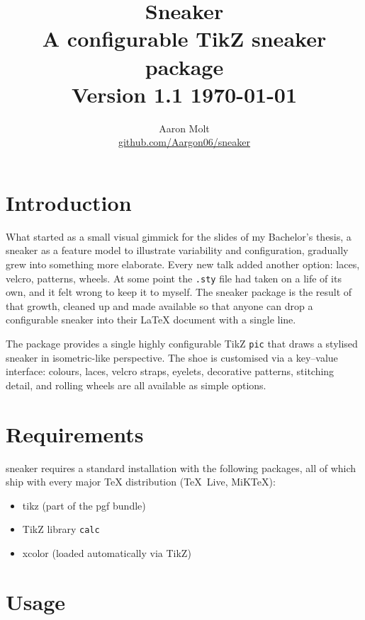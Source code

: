 \documentclass[a4paper, 11pt]{article}
\title{%
	\textbf{\textsf{Sneaker}}\\[4pt]
	\large A configurable TikZ sneaker package\\[2pt]
	\normalsize Version 1.1 \quad \today
}
\author{Aaron Molt\\\small\href{https://github.com/Aargon06/sneaker}{github.com/Aargon06/sneaker}}
\begin{document}
	
	\maketitle
	\tableofcontents
	\vspace{1em}
	
	\section{Introduction}
	
	What started as a small visual gimmick for the slides of my
	Bachelor's thesis, a sneaker as a feature model to illustrate
	variability and configuration, gradually grew into something more
	elaborate. Every new talk added another option: laces, velcro,
	patterns, wheels. At some point the \texttt{.sty} file had taken on
	a life of its own, and it felt wrong to keep it to myself.
	The \textsf{sneaker} package is the result of that growth,
	cleaned up and made available so that anyone can drop a
	configurable sneaker into their \LaTeX{} document with a single line.
	
	The package provides a single highly configurable TikZ \texttt{pic}
	that draws a stylised sneaker in isometric-like perspective.
	The shoe is customised via a key--value interface: colours, laces,
	velcro straps, eyelets, decorative patterns, stitching detail,
	and rolling wheels are all available as simple options.
	
	\section{Requirements}
	
	\textsf{sneaker} requires a standard \LaTeXe{} installation with
	the following packages, all of which ship with every major
	\TeX{} distribution (TeX~Live, MiKTeX):
	
	\begin{itemize}
		\item \textsf{tikz} (part of the \textsf{pgf} bundle)
		\item TikZ library \texttt{calc}
		\item \textsf{xcolor} (loaded automatically via TikZ)
	\end{itemize}
	
	\section{Usage}
	
\end{document}
